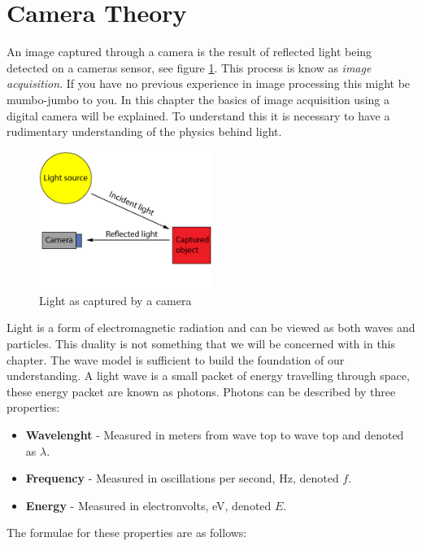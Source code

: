 \section{Camera Theory}

An image captured through a camera is the result of reflected light being detected on a cameras sensor, see figure \ref{fig:light_cam}. This process is know as \textit{image acquisition}. If you have no previous experience in image processing this might be mumbo-jumbo to you. In this chapter the basics of image acquisition using a digital camera will be explained. To understand this it is necessary to have a rudimentary understanding of the physics behind light.

\begin{figure}[htbp] 
\centering 
\includegraphics[width=0.5\textwidth]{Pictures/Theory/light_from_sun.png} 
\caption{Light as captured by a camera} 
\label{fig:light_cam} 
\end{figure}

Light is a form of electromagnetic radiation and can be viewed as both waves and particles. This duality is not something that we will be concerned with in this chapter. The wave model is sufficient to build the foundation of our understanding. A light wave is a small packet of energy travelling through space, these energy packet are known as photons. Photons can be described by three properties:

\begin{itemize}
\item \textbf{Wavelenght} - Measured in meters from wave top to wave top and denoted as $\lambda$.
\item \textbf{Frequency} - Measured in oscillations per second, Hz, denoted $f$.
\item \textbf{Energy} - Measured in electronvolts, eV, denoted $E$.
\end{itemize}

The formulae for these properties are as follows:

